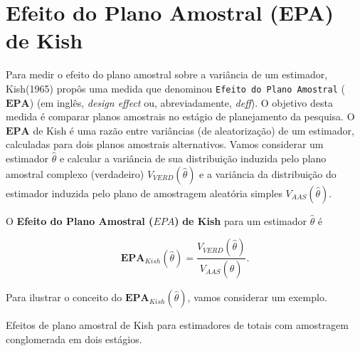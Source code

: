 \documentclass[]{book}
\numberwithin{example}{chapter}
\numberwithin{remark}{chapter}
\numberwithin{definition}{chapter}
\let\BeginKnitrBlock\begin \let\EndKnitrBlock\end
\begin{document}
\section{Efeito do Plano Amostral (EPA) de
Kish}\label{efeito-do-plano-amostral-epa-de-kish}

Para medir o efeito do plano amostral sobre a variância de um estimador,
Kish(1965) propôs uma medida que denominou
\texttt{Efeito\ do\ Plano\ Amostral} (\(\mathbf{EPA}\)) (em inglês,
\emph{design effect} ou, abreviadamente, \emph{deff}). O objetivo desta
medida é comparar planos amostrais no estágio de planejamento da
pesquisa. O \(\mathbf{EPA}\) de Kish é uma razão entre variâncias (de
aleatorização) de um estimador, calculadas para dois planos amostrais
alternativos. Vamos considerar um estimador \(\hat{\theta}\) e calcular
a variância de sua distribuição induzida pelo plano amostral complexo
(verdadeiro) \(V_{VERD}\left( \hat{\theta}\right)\) e a variância da
distribuição do estimador induzida pelo plano de amostragem aleatória
simples \(V_{AAS}\left(\hat{\theta}\right)\).

\BeginKnitrBlock{definition}
\protect\hypertarget{def:unnamed-chunk-47}{}{\label{def:unnamed-chunk-47}}O
\textbf{Efeito do Plano Amostral (\(EPA\))} \textbf{de Kish} para um
estimador \(\hat{\theta}\) é
\EndKnitrBlock{definition}

\begin{equation}
\mathbf{EPA}_{Kish}\left( \hat{\theta}\right) =\frac{V_{VERD}\left( \hat{\theta}\right) }{V_{AAS}\left( \hat{\theta}\right) }. \label{eq:epa1} \end{equation}

Para ilustrar o conceito do
\(\mathbf{EPA}_{Kish}\left( \hat{\theta}\right)\), vamos considerar um
exemplo.

\BeginKnitrBlock{example}
\protect\hypertarget{ex:epakish}{}{\label{ex:epakish}}Efeitos de plano
amostral de Kish para estimadores de totais com amostragem conglomerada
em dois estágios.
\EndKnitrBlock{example}
\end{document}
